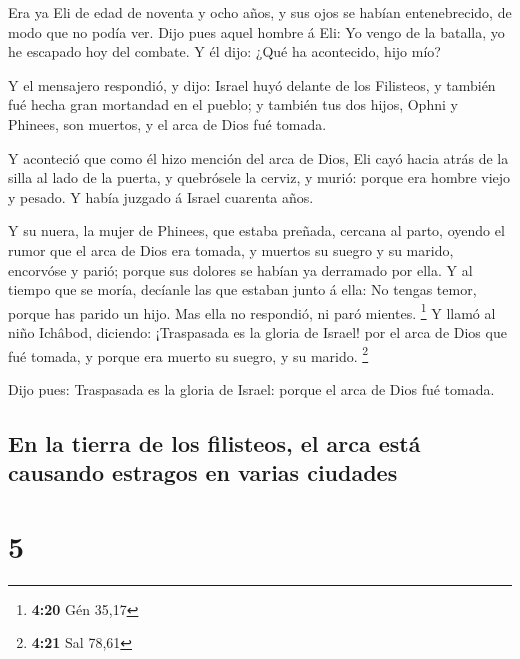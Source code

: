  Era ya Eli de edad de noventa y ocho años, y sus ojos se
habían entenebrecido, de modo que no podía ver.  Dijo pues
aquel hombre á Eli: Yo vengo de la batalla, yo he escapado hoy del
combate. Y él dijo: ¿Qué ha acontecido, hijo mío?

 Y el mensajero respondió, y dijo: Israel huyó delante de
los Filisteos, y también fué hecha gran mortandad en el pueblo; y
también tus dos hijos, Ophni y Phinees, son muertos, y el arca de Dios
fué tomada.

 Y aconteció que como él hizo mención del arca de Dios, Eli
cayó hacia atrás de la silla al lado de la puerta, y quebrósele la
cerviz, y murió: porque era hombre viejo y pesado. Y había juzgado á
Israel cuarenta años.

 Y su nuera, la mujer de Phinees, que estaba preñada,
cercana al parto, oyendo el rumor que el arca de Dios era tomada, y
muertos su suegro y su marido, encorvóse y parió; porque sus dolores se
habían ya derramado por ella.  Y al tiempo que se moría,
decíanle las que estaban junto á ella: No tengas temor, porque has
parido un hijo. Mas ella no respondió, ni paró mientes. \footnote{\textbf{4:20}
  Gén 35,17}  Y llamó al niño Ichâbod, diciendo:
¡Traspasada es la gloria de Israel! por el arca de Dios que fué tomada,
y porque era muerto su suegro, y su marido. \footnote{\textbf{4:21} Sal
  78,61}

 Dijo pues: Traspasada es la gloria de Israel: porque el
arca de Dios fué tomada.

\hypertarget{en-la-tierra-de-los-filisteos-el-arca-estuxe1-causando-estragos-en-varias-ciudades}{%
\subsection{En la tierra de los filisteos, el arca está causando
estragos en varias
ciudades}\label{en-la-tierra-de-los-filisteos-el-arca-estuxe1-causando-estragos-en-varias-ciudades}}

\hypertarget{section-4}{%
\section{5}\label{section-4}}

